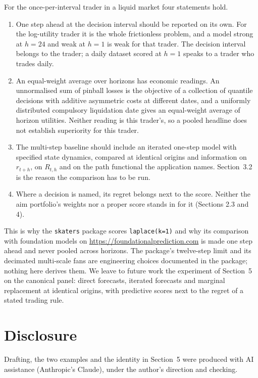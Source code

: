 \documentclass[11pt]{article}
\begin{document}
For the once-per-interval trader in a liquid market four statements hold.

\begin{enumerate}
\item One step ahead at the decision interval should be reported on its own. For the log-utility trader it is the whole frictionless problem, and a model strong at $h = 24$ and weak at $h = 1$ is weak for that trader. The decision interval belongs to the trader; a daily dataset scored at $h = 1$ speaks to a trader who trades daily.
\item An equal-weight average over horizons has economic readings. An unnormalised sum of pinball losses is the objective of a collection of quantile decisions with additive asymmetric costs at different dates, and a uniformly distributed compulsory liquidation date gives an equal-weight average of horizon utilities. Neither reading is this trader's, so a pooled headline does not establish superiority for this trader.
\item The multi-step baseline should include an iterated one-step model with specified state dynamics, compared at identical origins and information on $r_{t+h}$, on $R_{t,h}$ and on the path functional the application names. Section~3.2 is the reason the comparison has to be run.
\item Where a decision is named, its regret belongs next to the score. Neither the aim portfolio's weights nor a proper score stands in for it (Sections 2.3 and 4).
\end{enumerate}

This is why the \texttt{skaters} package scores \texttt{laplace(k=1)} and why its comparison with foundation models on \url{https://foundationalprediction.com} is made one step ahead and never pooled across horizons. The package's twelve-step limit and its decimated multi-scale fans are engineering choices documented in the package; nothing here derives them. We leave to future work the experiment of Section~5 on the canonical panel: direct forecasts, iterated forecasts and marginal replacement at identical origins, with predictive scores next to the regret of a stated trading rule.

\section*{Disclosure}

Drafting, the two examples and the identity in Section~5 were produced with AI assistance (Anthropic's Claude), under the author's direction and checking.



\end{document}
